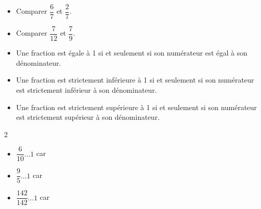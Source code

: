 \begin{Exemples}
\begin{itemize}[label=\textcolor{Couleur8}{$\bullet$}]
\item Comparer $\dfrac{6}{7}$ et $\dfrac{2}{7}$. 

\ligne

\ligne

\ligne

\item Comparer $\dfrac{7}{12}$ et $\dfrac{7}{9}$. 

\ligne

\end{itemize}
\end{Exemples}

\begin{Propriétés*}[c]
\leavevmode\vspace{-\baselineskip}
\begin{itemize}[label=\textcolor{Couleur1}{$\bullet$}]
\item Une fraction est égale à 1 si et seulement si son numérateur est égal à son dénominateur.

\item Une fraction est strictement inférieure à 1 si et seulement si son numérateur est strictement inférieur à son dénominateur.

\item Une fraction est strictement supérieure à 1 si et seulement si son numérateur est strictement supérieur à son dénominateur.
\end{itemize}
\end{Propriétés*}

\begin{Exemples}
\vspace{-0.5cm}
\begin{multicols}{2}
\begin{itemize}[label=\textcolor{Couleur8}{$\bullet$}]
\item $\dfrac{6}{10} \ldots 1$ car \ligne

\item $\dfrac{9}{5} \ldots 1$ car \ligne
\end{itemize}
\end{multicols}
\begin{itemize}[label=\textcolor{Couleur8}{$\bullet$}]
\item $\dfrac{142}{142} \ldots 1$ car \ligne

\end{itemize}
\end{Exemples}

